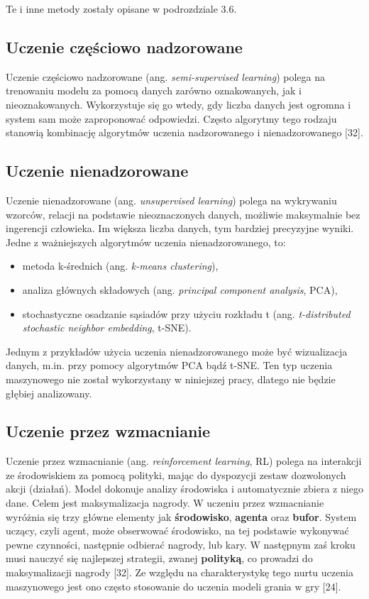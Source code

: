 \noindent Te i inne metody zostały opisane w podrozdziale 3.6. 

\subsection{Uczenie częściowo nadzorowane}
\label{cha:cha3.2.2}

Uczenie częściowo nadzorowane (ang. \textit{semi-supervised learning}) polega na trenowaniu modelu za pomocą danych zarówno oznakowanych, jak i nieoznakowanych. Wykorzystuje się go wtedy, gdy liczba danych jest ogromna i system sam może zaproponować odpowiedzi. Często algorytmy tego rodzaju stanowią kombinację algorytmów uczenia nadzorowanego i nienadzorowanego [32].

\subsection{Uczenie nienadzorowane}
\label{cha:cha3.2.3}

Uczenie nienadzorowane (ang. \textit{unsupervised learning}) polega na wykrywaniu wzorców, relacji na podstawie nieoznaczonych danych, możliwie maksymalnie bez ingerencji człowieka. Im większa liczba danych, tym bardziej precyzyjne wyniki. Jedne z ważniejszych algorytmów uczenia nienadzorowanego, to:
\begin{itemize}
\item
metoda k-średnich (ang. \textit{k-means clustering}),

\item
analiza głównych składowych (ang. \textit{principal component analysis}, PCA),

\item
stochastyczne osadzanie sąsiadów przy użyciu rozkładu t (ang. \textit{t-distributed stochastic neighbor embedding}, t-SNE).
\end{itemize}

\noindent Jednym z przykładów użycia uczenia nienadzorowanego może być wizualizacja danych, m.in. przy pomocy algorytmów PCA bądź t-SNE. Ten typ uczenia maszynowego nie został wykorzystany w niniejszej pracy, dlatego nie będzie głębiej analizowany.

\subsection{Uczenie przez wzmacnianie}
\label{cha:cha3.2.4}

Uczenie przez wzmacnianie (ang. \textit{reinforcement learning}, RL) polega na interakcji ze środowiskiem za pomocą polityki, mając do dyspozycji zestaw dozwolonych akcji (działań). Model dokonuje analizy środowiska i automatycznie zbiera z niego dane. Celem jest maksymalizacja nagrody. W uczeniu przez wzmacnianie wyróżnia się trzy główne elementy jak \textbf{środowisko}, \textbf{agenta} oraz \textbf{bufor}. System uczący, czyli agent, może obserwować środowisko, na tej podstawie wykonywać pewne czynności, następnie odbierać nagrody, lub kary. W następnym zaś kroku musi nauczyć się najlepszej strategii, zwanej \textbf{polityką}, co prowadzi do maksymalizacji nagrody [32]. Ze względu na charakterystykę tego nurtu uczenia maszynowego jest ono często stosowanie do uczenia modeli grania w gry [24].

